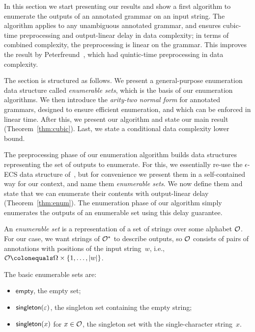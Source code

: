 %
%
%

%
%

In this section we start presenting our results and show a first
algorithm to enumerate the outputs of an annotated grammar on an input string.
%
%
%
The algorithm applies to any unambiguous annotated grammar, and ensures cubic-time preprocessing and
output-linear delay in data complexity; in terms of combined complexity, the
preprocessing is linear on the grammar.
%
%
This improves the result by
Peterfreund~\cite{Peterfreund21}, which had quintic-time preprocessing in data complexity.
%
%
%

%
%
%
%
%
%
%
%

The section is structured as follows.
We present a general-purpose enumeration data structure called
\emph{enumerable sets}, which is the basis of 
our enumeration algorithms. 
We then introduce the \emph{arity-two normal form} for annotated grammars,
designed to ensure efficient enumeration, and which can be
enforced in linear time.
After this, we present
our algorithm and state our main result (Theorem~\ref{thm:cubic}).
Last, we state a conditional
data complexity lower bound.
%
%
%
%
%
%


The preprocessing phase of our enumeration algorithm builds data structures
representing the set of outputs to enumerate. For this, we essentially re-use
the $\epsilon$-ECS data structure of~\cite{icdt2020nested}, but for convenience
we present them in a self-contained way for our context, and
name them \emph{enumerable sets}.
We now define them and state that we can enumerate their contents
with output-linear delay (Theorem~\ref{thm:enum}).
The enumeration phase of our algorithm simply enumerates the outputs of 
an enumerable set using this delay guarantee.

An \emph{enumerable set}  is a representation of a set of
strings over some alphabet $\mathcal{O}$.  For our case, we want strings of
$\mathcal{O}^*$ to describe outputs, so $\mathcal{O}$ consists of pairs of
%
%
annotations
with positions of the input
string~$w$, i.e.,
$\O \colonequals \Omega \times \{1, \ldots, |w|\}$.
%

The basic enumerable sets are:
\begin{itemize}
  \item $\textsf{empty}$, the empty set;
  \item $\textsf{singleton}(\varepsilon)$, the singleton set containing the empty string;
  \item $\textsf{singleton}(x)$ for
$x \in \mathcal{O}$, the singleton set with the
    single-character string~$x$.
\end{itemize}

